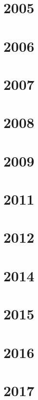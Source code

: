 \section{2005}

\section{2006}


\section{2007}

\section{2008}

\section{2009}

\section{2011}

\section{2012}

\section{2014}

\section{2015}

\section{2016}

\section{2017}


